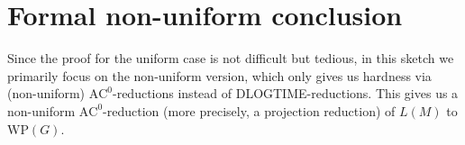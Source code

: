 \section*{Formal non-uniform conclusion}
Since the proof for the uniform case is not difficult but tedious, in this sketch we primarily focus on the non-uniform version, which only gives us hardness via (non-uniform) $\mathrm{AC}^0$-reductions instead of DLOGTIME-reductions.
This gives us a non-uniform $\mathrm{AC}^0$-reduction (more precisely, a projection reduction) of $L(M)$ to $\mathrm{WP}(G)$.
